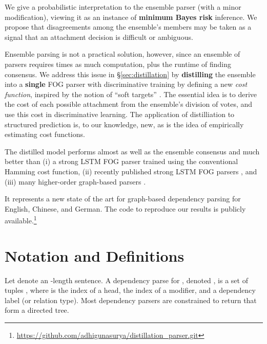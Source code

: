 \documentclass[11pt,letterpaper]{article}
\newcommand{\ignore}[1]{}
\newcommand{\adhicomment}[1]{\ignore{\textcolor{green}{{\textbf{[#1 --\textsc{adhi}]}}}}}
\newcommand{\nascomment}[1]{\ignore{\textcolor{blue}{{\textbf{[#1 --\textsc{nas}]}}}}}
\begin{document}
We give a probabilistic interpretation to the ensemble parser (with a minor modification), viewing it as an instance of \textbf{minimum Bayes risk} inference.  We propose that disagreements among the ensemble's members may be taken as a signal that an attachment decision is difficult or ambiguous.

Ensemble parsing is not a practical solution, however, since an ensemble of  parsers requires  times as much computation, plus the runtime of finding consensus.  We address this issue in \S\ref{sec:distillation} by \textbf{distilling} the ensemble into a \textbf{single} FOG parser with discriminative training by defining a new \emph{cost function},
inspired by the notion of ``soft targets'' \cite{dark_knowledge}.  The essential idea is to derive the cost of each possible attachment from the ensemble's division of votes, and use this cost in discriminative learning.
The application of distilliation to structured prediction is, to our knowledge, new, as is the idea of empirically estimating cost functions.

The distilled model performs almost as well as the ensemble consensus and much better than (i)  a strong LSTM FOG parser trained using the conventional Hamming cost function, (ii) recently published strong LSTM FOG parsers \cite{kiperwasser,graph_based_segment}, and (iii) many higher-order graph-based parsers \cite{third_order,turbo_parser,le_zuidema}.
\adhicomment{Added a citation to the recent graph-based LSTM ACL 2016 paper}
\nascomment{collapsed to go with Kiperwasser}  It represents a new state of the art for graph-based dependency parsing for English, Chinese, and German. 
The code to reproduce our results is publicly available.\footnote{\url{https://github.com/adhigunasurya/distillation_parser.git}} 
















\section{Notation and Definitions}


Let  denote an -length sentence.  A dependency parse
for , denoted , is a set of tuples , where  is the index of a head,  the index of a modifier, and  a dependency label (or relation type).  Most dependency parsers are constrained to return  that form a directed tree.  
\end{document}
